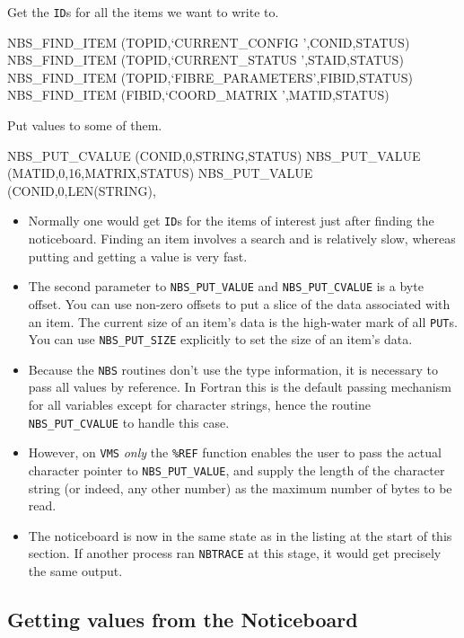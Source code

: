 \documentclass[twoside,11pt,nolof]{starlink}
\begin{document}
Get the \texttt{ID}s for all the items we want to write to.

\begin{terminalv}
NBS_FIND_ITEM (TOPID,`CURRENT_CONFIG  ',CONID,STATUS)
NBS_FIND_ITEM (TOPID,`CURRENT_STATUS  ',STAID,STATUS)
NBS_FIND_ITEM (TOPID,`FIBRE_PARAMETERS',FIBID,STATUS)
NBS_FIND_ITEM (FIBID,`COORD_MATRIX    ',MATID,STATUS)
\end{terminalv}

Put values to some of them.

\begin{terminalv}
NBS_PUT_CVALUE (CONID,0,STRING,STATUS)
NBS_PUT_VALUE  (MATID,0,16,MATRIX,STATUS)
NBS_PUT_VALUE  (CONID,0,LEN(STRING),%
\end{terminalv}

\begin {itemize}
\item Normally one would get \texttt{ID}s for the items of interest just after
finding the noticeboard. Finding an item involves a search and is relatively
slow, whereas putting and getting a value is very fast.
\item The second parameter to \texttt{NBS\_PUT\_VALUE} and \texttt{NBS\_PUT\_CVALUE}
is a byte offset. You
can use non-zero offsets to put a slice of the data associated with an item.
The current size of an item's data is the high-water mark of all \texttt{PUT}s.
You can use \texttt{NBS\_PUT\_SIZE} explicitly to set the size of an item's data.
\item Because the \texttt{NBS} routines don't use the type information, it is
necessary to pass all values by reference. In Fortran this is the default
passing mechanism for all variables except for character strings, hence the
routine \texttt{NBS\_PUT\_CVALUE} to handle this case.
\item However, on \texttt{VMS} \emph{only} the \texttt{\%REF} function enables the
user to pass the actual character pointer to \texttt{NBS\_PUT\_VALUE}, and supply
the length of the character string (or indeed, any other number) as the
maximum number of bytes to be read.
\item The noticeboard is now in the same state as in the listing at the start
of this section. If another process ran \texttt{NBTRACE} at this stage, it would get
precisely the same output.
\end {itemize}

\subsection {Getting values from the Noticeboard}
\end{document}
